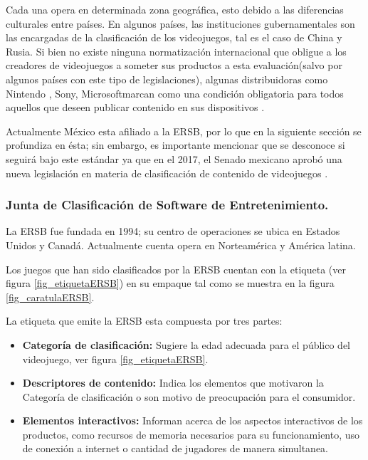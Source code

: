         Cada una opera en determinada zona geográfica, esto debido a las diferencias
         culturales entre países. En algunos países, las instituciones 
         gubernamentales son las encargadas de la clasificación de los 
         videojuegos, tal es el caso de China y Rusia. Si bien no existe ninguna 
         normatización internacional que obligue a los creadores de videojuegos 
         a someter sus productos a esta evaluación(salvo por algunos países con 
         este tipo de legislaciones), algunas distribuidoras como Nintendo
         \textregistered, Sony\textregistered, Microsoft\textregistered marcan 
         como una condición obligatoria para todos aquellos que deseen publicar 
         contenido en sus dispositivos \cite{RefObligacion}.
        \\
        \par
        Actualmente México esta afiliado a la ERSB, por lo que en la siguiente 
        sección se profundiza en ésta; sin embargo, es importante mencionar que 
        se desconoce si seguirá bajo este estándar ya que en el 2017, el Senado 
        mexicano aprobó una nueva legislación en materia de clasificación de 
        contenido de videojuegos \cite{RefRegulacionMex}. 

	\subsubsection{Junta de Clasificación de Software de Entretenimiento.}
	La ERSB fue fundada en 1994; su centro de operaciones se ubica en Estados 
	Unidos y Canadá. Actualmente cuenta opera en Norteamérica y América latina.
        \\
        \par
	Los juegos que han sido clasificados por la ERSB cuentan con la etiqueta (ver 
	figura \ref{fig_etiquetaERSB}) en su empaque tal como se muestra en la figura
	 \ref{fig_caratulaERSB}. 
        \\
        \par
        La etiqueta que emite la ERSB esta compuesta por tres partes:
                \begin{itemize}
                        \item \textbf{Categoría de clasificación:} Sugiere la edad
                         adecuada para el público del videojuego, ver figura 
                         \ref{fig_etiquetaERSB}.
                        \item \textbf{Descriptores de contenido:} Indica los elementos
                         que motivaron la Categoría de clasificación o son motivo de 
                         preocupación para el consumidor.
                        \item \textbf{Elementos interactivos:} Informan acerca de los 
                        aspectos interactivos de los productos, como recursos de memoria 						necesarios para su funcionamiento, uso de conexión a internet o 							cantidad de jugadores de manera simultanea.
                \end{itemize}      	
	
